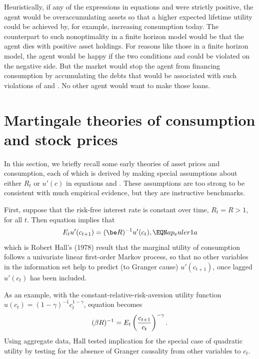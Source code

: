 Heuristically, if any of the expressions in equations  and
 were strictly positive, the agent would be overaccumulating
assets so that a higher expected lifetime utility could be achieved by,
for example, increasing consumption today. The counterpart to such
nonoptimality in a finite horizon model would be that the agent dies
with positive asset holdings. For reasons  like those
in a finite horizon model, the agent would be happy if the two
conditions  and  could be violated on the negative
side. But the market would stop the agent from
financing consumption by accumulating the debts that would be
associated with  such  violations of  and . No
other agent would want to make those loans.

\newpage
\section{Martingale theories of consumption and stock prices}

In this section, we briefly recall some early theories
of asset prices and consumption, each of which is derived by
making special assumptions about either $R_t$ or $u'(c)$ in equations
 and .  These assumptions are too strong
to be consistent with much empirical evidence, but they are instructive
benchmarks.

First, suppose that the risk-free interest rate is constant over time,
$R_t=R>1$, for all $t$.  Then equation  implies that
$$E_t u'(c_{t+1}) =(\be R)^{-1} u'(c_t),                    \EQN ap_euler1a  $$
which is Robert Hall's (1978) result that the marginal utility of consumption
follows a univariate linear first-order Markov process, so that no other
variables in the information set help to predict (to Granger cause)
$u'(c_{t+1})$, once lagged $u'(c_t)$ has been included.

As an example,  with the constant-relative-risk-aversion utility function
$u(c_t)=(1-\gamma)^{-1} c_t^{1- \gamma}$, equation  becomes
$$ (\beta R)^{-1} = E_t \left(c_{t+1} \over c_t \right)^{-\gamma}.  $$
Using aggregate data, Hall tested implication  for the special case of
quadratic utility by testing for the absence of Granger causality from other
variables to $c_t$.

